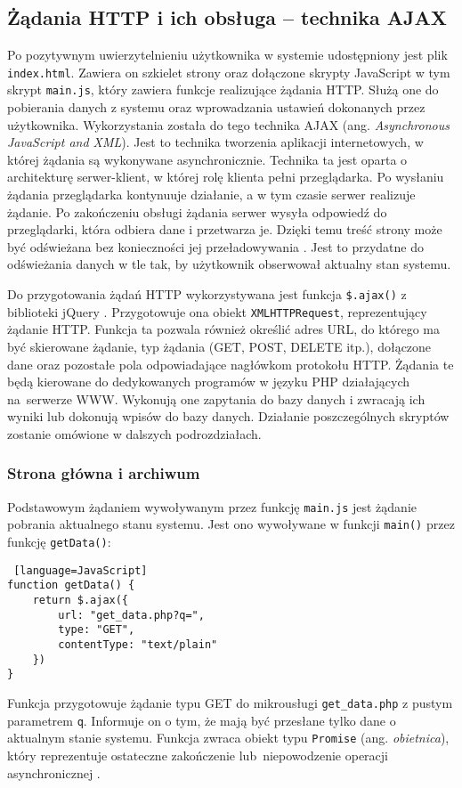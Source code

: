 \documentclass[a4paper,11pt,twoside]{article}
\begin{document}
\subsection{Żądania HTTP i ich obsługa -- technika AJAX}
Po pozytywnym uwierzytelnieniu użytkownika w systemie udostępniony jest plik \texttt{index.html}. Zawiera on szkielet strony oraz dołączone skrypty JavaScript w tym skrypt \texttt{main.js}, który zawiera funkcje realizujące żądania HTTP. Służą one do pobierania danych z systemu oraz wprowadzania ustawień dokonanych przez użytkownika. Wykorzystania została do tego technika AJAX (ang. \textit{Asynchronous JavaScript and XML}). Jest to technika tworzenia aplikacji internetowych, w której żądania są wykonywane asynchronicznie. Technika ta jest oparta o architekturę serwer-klient, w której rolę klienta pełni przeglądarka. Po wysłaniu żądania przeglądarka kontynuuje działanie, a w tym czasie serwer realizuje żądanie. Po zakończeniu obsługi żądania serwer wysyła odpowiedź do przeglądarki, która odbiera dane i przetwarza je. Dzięki temu treść strony może być odświeżana bez konieczności jej przeładowywania \cite{ajax}. Jest to przydatne do odświeżania danych w tle tak, by użytkownik obserwował aktualny stan systemu.

Do przygotowania żądań HTTP wykorzystywana jest funkcja \texttt{\$.ajax()} z biblioteki jQuery \cite{jquery_ajax}. Przygotowuje ona obiekt \texttt{XMLHTTPRequest}, reprezentujący żądanie HTTP. Funkcja ta pozwala również określić adres URL, do którego ma być skierowane żądanie, typ żądania (GET, POST, DELETE itp.), dołączone dane oraz pozostałe pola odpowiadające nagłówkom protokołu HTTP. Żądania te będą kierowane do dedykowanych programów w języku PHP działających na~serwerze WWW. Wykonują one zapytania do bazy danych i zwracają ich wyniki lub dokonują wpisów do bazy danych. Działanie poszczególnych skryptów zostanie omówione w dalszych podrozdziałach.

\subsubsection{Strona główna i archiwum}
Podstawowym żądaniem wywoływanym przez funkcję \texttt{main.js} jest żądanie pobrania aktualnego stanu systemu. Jest ono wywoływane w funkcji \texttt{main()} przez funkcję \texttt{getData()}:
\begin{lstlisting} [language=JavaScript]
function getData() {
    return $.ajax({
        url: "get_data.php?q=",
        type: "GET",
        contentType: "text/plain"
    })
}
\end{lstlisting}
Funkcja przygotowuje żądanie typu GET do mikrousługi \texttt{get{\_}data.php} z pustym parametrem \texttt{q}. Informuje on o tym, że mają być przesłane tylko dane o aktualnym stanie systemu. Funkcja zwraca obiekt typu \texttt{Promise} (ang. \textit{obietnica}), który reprezentuje ostateczne zakończenie lub~niepowodzenie operacji asynchronicznej \cite{promise}. 
\end{document}
